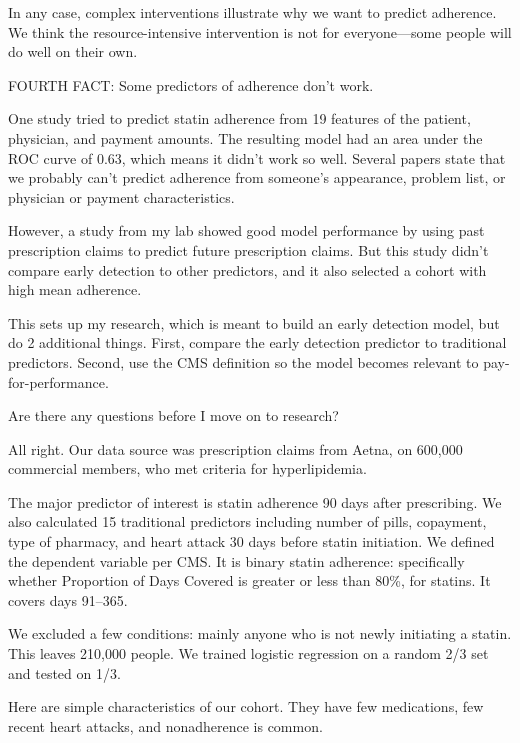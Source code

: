 \documentclass[12pt]{report}
\begin{document}
\begin{large}
In any case, complex interventions illustrate why we want to predict
adherence. We think the resource-intensive intervention is not for
everyone---some people will do well on their own.

FOURTH FACT: Some predictors of adherence don't work. %

One study tried to predict statin adherence from 19 features of the
patient, physician, and payment amounts. The resulting model had an
area under the ROC curve of 0.63, which means it didn't work so well.
Several papers state that we probably can't predict adherence from
someone's appearance, problem list, or physician or payment
characteristics. %

However, a study from my lab showed good model performance by using
past prescription claims to predict future prescription claims. But
this study didn't compare early detection to other predictors, and it
also selected a cohort with high mean adherence. %

This sets up my research, which is meant to build an early detection
model, but do 2 additional things. First, compare the early detection
predictor to traditional predictors. Second, use the CMS definition so
the model becomes relevant to pay-for-performance.

Are there any questions before I move on to research?








All right. Our data source was prescription claims from Aetna, on
600,000 commercial members, who met criteria for hyperlipidemia. %

The major predictor of interest is statin adherence 90 days after
prescribing. We also calculated 15 traditional predictors including
number of pills, copayment, type of pharmacy, and heart attack 30 days
before statin initiation. We defined the dependent variable per CMS.
It is binary statin adherence: specifically whether Proportion of Days
Covered is greater or less than 80\%, for statins. It covers days
91--365. %

We excluded a few conditions: mainly anyone who is not newly
initiating a statin. This leaves 210,000 people. We trained logistic
regression on a random 2/3 set and tested on 1/3. %

Here are simple characteristics of our cohort. They have few
medications, few recent heart attacks, and nonadherence is common.


\end{large}
\end{document}
